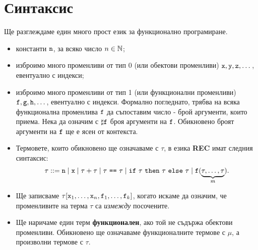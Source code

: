 \section{Синтаксис}
Ще разглеждаме един много прост език за функционално програмиране.
\begin{itemize}
\item
  константи $\texttt{n}$, за всяко число $n \in \mathbb{N}$;
\item
  изброимо много променливи от тип 0 (или обектови променливи) $\texttt{x}, \texttt{y}, \texttt{z}, \dots$, евентуално с индекси;
\item
  изброимо много променливи от тип 1 (или функционални променливи) $\texttt{f},\texttt{g},\texttt{h},\dots$, евентуално с индекси. 
  Формално погледнато, трябва на всяка функционална променлива $\texttt{f}$
  да съпоставим число - брой аргументи, които приема. Нека да означим с $\sharp\texttt{f}$ броя аргументи на $\texttt{f}$.
  Обикновено броят аргументи на $\texttt{f}$ ще е ясен от контекста.
\item
  Термовете, които обикновено ще означаваме с $\tau$, в езика {\bf REC} имат следния синтаксис:
  \[\tau ::= \texttt{n} \mid \texttt{x} \mid \tau + \tau \mid \tau\ \texttt{==}\ \tau \mid \texttt{if}\ \tau\ \texttt{then}\ \tau\ \texttt{else}\ \tau \mid \texttt{f}(\underbrace{\tau,\dots,\tau}_{m}).\]
\item
  Ще записваме $\tau[\texttt{x}_1,\dots,\texttt{x}_n,\texttt{f}_1,\dots,\texttt{f}_k]$, когато искаме да означим, че променливите
  на терма $\tau$ са {\em измежду} посочените.
\item
  Ще наричаме един терм {\bf функционален}, ако той не съдържа обектови променливи.
  Обикновено ще означаваме функционалните термове с $\mu$, а произволни термове с $\tau$.

\end{itemize}
